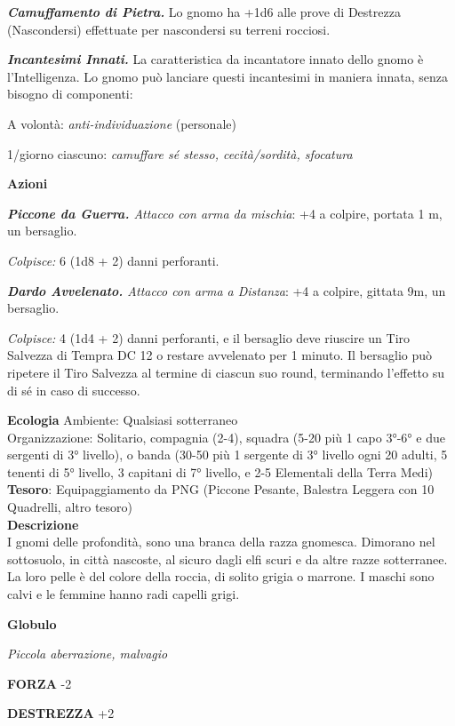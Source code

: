 \begin{multicols}{2}
\textit{\textbf{Camuffamento di Pietra.}} Lo gnomo ha +1d6 alle prove di Destrezza (Nascondersi) effettuate per nascondersi su terreni rocciosi.

\textit{\textbf{Incantesimi Innati.}} La caratteristica da incantatore innato dello gnomo è l'Intelligenza. Lo gnomo può lanciare questi incantesimi in maniera innata, senza bisogno di componenti:

A volontà: \textit{anti-individuazione} (personale)

1/giorno ciascuno: \textit{camuffare sé stesso, cecità/sordità, sfocatura}

\textbf{Azioni}

\textit{\textbf{Piccone da Guerra.} Attacco con arma da mischia}: +4 a colpire, portata 1 m, un bersaglio.

\textit{Colpisce:} 6 (1d8 + 2) danni perforanti.

\textit{\textbf{Dardo Avvelenato.} Attacco con arma a Distanza}: +4 a colpire, gittata 9m, un bersaglio.

\textit{Colpisce:} 4 (1d4 + 2) danni perforanti, e il bersaglio deve riuscire un Tiro Salvezza di Tempra DC 12 o restare avvelenato per 1 minuto. Il bersaglio può ripetere il Tiro Salvezza al termine di ciascun suo round, terminando l'effetto su di sé in caso di successo.

\textbf{Ecologia}
Ambiente: Qualsiasi sotterraneo\\
Organizzazione: Solitario, compagnia (2-4), squadra (5-20 più 1 capo 3°-6° e due sergenti di 3° livello), o banda (30-50 più 1 sergente di 3° livello ogni 20 adulti, 5 tenenti di 5° livello, 3 capitani di 7° livello, e 2-5 Elementali della Terra Medi)\\
\textbf{Tesoro}: Equipaggiamento da PNG (Piccone Pesante, Balestra Leggera con 10 Quadrelli, altro tesoro)\\
\textbf{Descrizione}\\
I gnomi delle profondità, sono una branca della razza gnomesca. Dimorano nel sottosuolo, in città nascoste, al sicuro dagli elfi scuri e da altre razze sotterranee. La loro pelle è del colore della roccia, di solito grigia o marrone. I maschi sono calvi e le femmine hanno radi capelli grigi.

\medskip{}\textbf{Globulo}

\textit{Piccola aberrazione, malvagio}

\textbf{FORZA} -2

\textbf{DESTREZZA} +2


\end{multicols}
